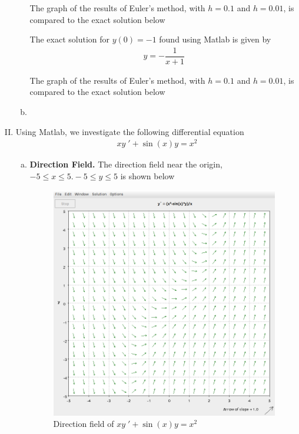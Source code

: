 \documentclass[a4paper,12pt]{article}
\begin{document}
\begin{enumerate}[I.]
\begin{enumerate}[a)]
      The graph of the results of Euler's method, with $h=0.1$ and $h=0.01$, is compared to the exact solution below
      
            
      The exact solution for $y(0)=-1$ found using Matlab is given by
      \begin{align*}
        y=-\dfrac{1}{x+1}
      \end{align*}

      The graph of the results of Euler's method, with $h=0.1$ and $h=0.01$, is compared to the exact solution below
      
            
    \item
  \end{enumerate}
  
  \item Using Matlab, we investigate the following differential equation
  \begin{align*}
    xy\;' + \sin(x)y = x^2
  \end{align*}
  \begin{enumerate}[a)]
    \item \textbf{Direction Field.} The direction field near the origin, $-5 \leq x \leq 5. -5 \leq y \leq 5$ is shown below
    \begin{figure}[H]
      \begin{center}
        \includegraphics[scale=.3]{31.png}
        \caption{Direction field of $xy\;' + \sin(x)y = x^2$}
        \label{fig:5}
      \end{center}
    \end{figure}
    

\end{enumerate}
\end{enumerate}
\end{document}

